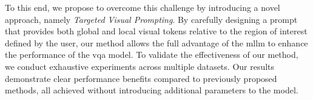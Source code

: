 

To this end, we propose to overcome this challenge by introducing a novel approach, namely {\it Targeted Visual Prompting}. By carefully designing a prompt that provides both global and local visual tokens relative to the region of interest defined by the user, our method allows the full advantage of the \gls{mllm} to enhance the performance of the \gls{vqa} model. To validate the effectiveness of our method, we conduct exhaustive experiments across multiple datasets. Our results demonstrate clear performance benefits compared to previously proposed methods, all achieved without introducing additional parameters to the model. %



